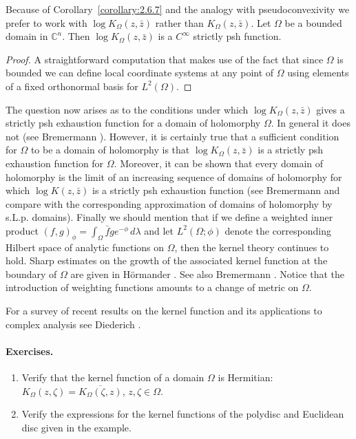 Because of Corollary~\ref{corollary:2.6.7} and the analogy with pseudoconvexivity we prefer to work with $\log K_\Omega(z,\bar z)$ rather than $K_\Omega(z,\bar z)$.
 Let $\Omega$ be a bounded domain in $\mathbb C^n$. Then $\log K_\Omega(z,\bar z)$ is a $C^\infty$ strictly psh function.
\begin{proof}
A straightforward computation that makes use of the fact that since $\Omega$ is bounded we can define local coordinate systems at any point of $\Omega$ using elements of a fixed orthonormal basis for $L^2(\Omega)$.
\end{proof}
The question now arises as to the conditions under which $\log K_\Omega(z,\bar z)$ gives a strictly psh exhaustion function for a domain of holomorphy $\Omega$. In general it does not (see Bremermann \cite{bib:I:bremermann-h-j:3}). However, it is certainly true that a sufficient condition for $\Omega$ to be a domain of holomorphy is that $\log K_\Omega(z,\bar z)$ is a strictly psh exhaustion function for $\Omega$. Moreover, it can be shown that every domain of holomorphy is the limit of an increasing sequence of domains of holomorphy for which $\log K(z,\bar z)$ is a strictly psh exhaustion function (see Bremermann \cite{bib:I:bremermann-h-j:2} and compare with the corresponding approximation of domains of holomorphy by s.L.p. domains). Finally we should mention that if we define a weighted inner product $(f,g)_\phi=\int_\Omega\bar f g e^{-\phi}\,d\lambda$ and let $L^2(\Omega;\phi)$ denote the corresponding Hilbert space of analytic functions on $\Omega$, then the kernel theory continues to hold. Sharp estimates on the growth of the associated kernel function at the boundary of $\Omega$ are given in H\"ormander \cite{bib:I:hormander-l:3}. See also Bremermann \cite{bib:I:bremermann-h-j:2}. Notice that the introduction of weighting functions amounts to a change of metric on $\Omega$.

For a survey of recent results on the kernel function and its applications to complex analysis see Diederich \cite{bib:I:diederich-k:1}.
\paragraph*{Exercises.}
\begin{enumerate}
\item Verify that the kernel function of a domain $\Omega$ is Hermitian: $K_\Omega(z,\zeta)=\overline{K_\Omega(\zeta,z)}$, $z,\zeta\in\Omega$.
\item Verify the expressions for the kernel functions of the polydisc and Euclidean disc given in the example.
\end{enumerate}

